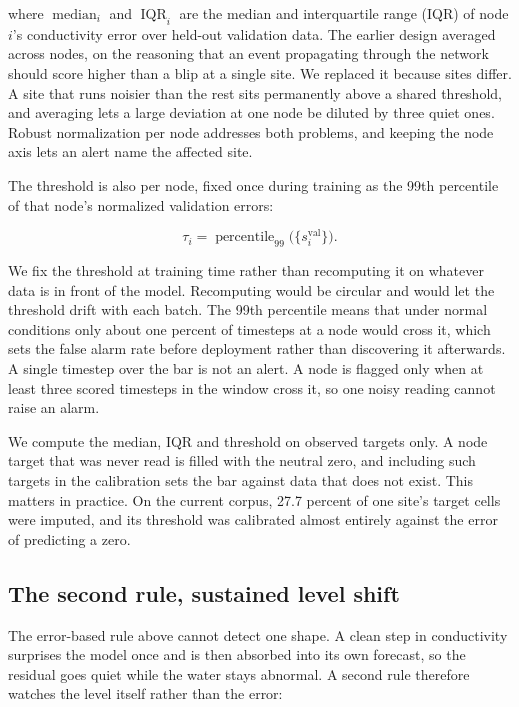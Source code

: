 \documentclass{article}
\begin{document}
where $\operatorname{median}_i$ and $\operatorname{IQR}_i$ are the median and
interquartile range (IQR) of node $i$'s conductivity error over held-out
validation data. The earlier design averaged across nodes, on the reasoning
that an event propagating through the network should score higher than a blip
at a single site. We replaced it because sites differ. A site that runs
noisier than the rest sits permanently above a shared threshold, and averaging
lets a large deviation at one node be diluted by three quiet ones. Robust
normalization per node addresses both problems, and keeping the node axis lets
an alert name the affected site.

The threshold is also per node, fixed once during training as the 99th
percentile of that node's normalized validation errors:

\begin{equation}
  \label{eq:threshold}
  \tau_i = \operatorname{percentile}_{99}\big( \{ s_i^{\text{val}} \} \big).
\end{equation}

We fix the threshold at training time rather than recomputing it on whatever
data is in front of the model. Recomputing would be circular and would let the
threshold drift with each batch. The 99th percentile means that under normal
conditions only about one percent of timesteps at a node would cross it, which
sets the false alarm rate before deployment rather than discovering it
afterwards. A single timestep over the bar is not an alert. A node is flagged
only when at least three scored timesteps in the window cross it, so one noisy
reading cannot raise an alarm.

We compute the median, IQR and threshold on observed targets only. A node
target that was never read is filled with the neutral zero, and including such
targets in the calibration sets the bar against data that does not exist. This
matters in practice. On the current corpus, 27.7 percent of one site's target
cells were imputed, and its threshold was calibrated almost entirely against
the error of predicting a zero.

\subsection{The second rule, sustained level shift}
\label{sec:rule2}

The error-based rule above cannot detect one shape. A clean step in
conductivity surprises the model once and is then absorbed into its own
forecast, so the residual goes quiet while the water stays abnormal. A second
rule therefore watches the level itself rather than the error:
\end{document}
